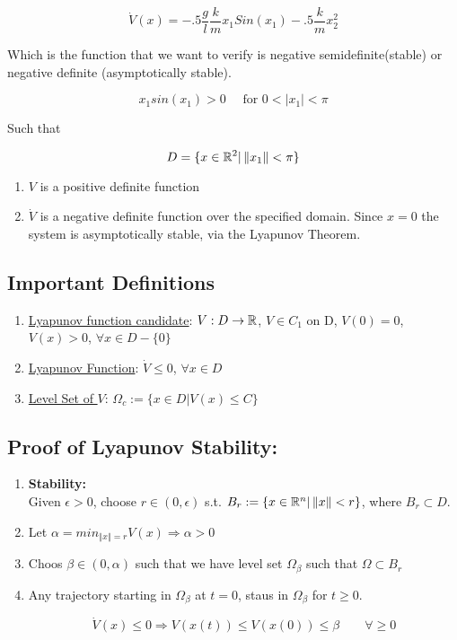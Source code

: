 $$
\dot{V}(x) = -.5 \frac{g}{l}\frac{k}{m}x_1 Sin(x_1) - .5 \frac{k}{m}x_2^2
$$

\noindent Which is the function that we want to verify is negative semidefinite(stable) or negative definite (asymptotically stable).

$$
x_1sin(x_1)> 0 \quad \text{ for } 0<|x_1|< \pi
$$

\noindent Such that

$$
D = \{ x \in \mathbb{R}^2 | \left\Vert x_1 \right\Vert < \pi \}
$$


\begin{enumerate}
  \item $V$ is a positive definite function
  \item $\dot{V}$ is a negative definite function over the specified domain. Since $x =0 $ the system is asymptotically stable, via the Lyapunov Theorem.
\end{enumerate}

\subsection*{Important Definitions}

\begin{enumerate}
  \item \underline{Lyapunov function candidate}:
  $V: D \rightarrow \mathbb{R}$, $V \in C_1$ on D, $V(0) = 0$, $V(x)>0$, $\forall x \in D - \{ 0 \}$
  \item \underline{Lyapunov Function}: $\dot{V}\leq 0 $, $\forall x \in D$
  \item \underline{Level Set of $V$}: $\Omega_c := \{ x \in D | V(x) \leq C \}$
\end{enumerate}


\subsection*{Proof of Lyapunov Stability:}

\begin{enumerate}
  \item \textbf{Stability:} \\
  Given $\epsilon > 0$, choose $r \in (0, \epsilon)$ s.t. $B_r := \{ x \in \mathbb{R}^n | \left\Vert x \right\Vert < r\}$, where $B_r \subset D$.
  \item Let $\alpha = min_{\left\Vert x \right\Vert  = r} V(x) \Rightarrow \alpha > 0$
  \item Choos $\beta \in (0, \alpha)$ such that we have level set $\Omega_{\beta}$ such that $\Omega \subset B_r$
  \item Any trajectory starting in $\Omega_{\beta}$ at $t = 0$, staus in $\Omega_{\beta}$ for $t \geq 0$.

  $$
\dot{V}(x) \leq 0 \Rightarrow V(x(t)) \leq V(x(0)) \leq \beta \quad \quad \forall \geq 0
  $$
\end{enumerate}

